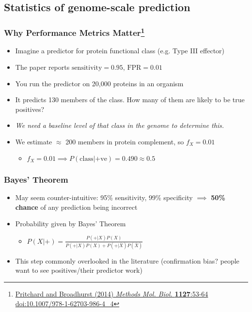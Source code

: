 


\subsection{Statistics of genome-scale prediction}
\begin{frame}
  \frametitle{Why Performance Metrics Matter\footnote{\tiny{\href{http://dx.doi.org/10.1007/978-1-62703-986-4_4}{Pritchard and Broadhurst (2014) \textit{Methods Mol. Biol.} \textbf{1127}:53-64 doi:10.1007/978-1-62703-986-4\_4}}}}
  \begin{itemize}
    \item<1-> Imagine a predictor for protein functional class (e.g. Type III effector)
    \item<1-> The paper reports \textbf{$\text{sensitivity}=0.95$}, \textbf{$\text{FPR}=0.01$}
    \item<1-> You run the predictor on 20,000 proteins in an organism
    \item<1-> It predicts 130 members of the class. How many of them are likely to be true positives?
    \item<2-> \textit{We need a baseline level of that class in the genome to determine this.}        
    \item<2-> We estimate $\approx$ 200 members in protein complement, so $f_X=0.01$
    \begin{itemize}
      \item $f_X = 0.01 \implies P(\text{class}|\text{+ve}) = 0.490 \approx 0.5$
    \end{itemize}
  \end{itemize} 
\end{frame}

\begin{frame}
  \frametitle{Bayes' Theorem}
  \begin{itemize}
    \item May seem counter-intuitive: 95\% sensitivity, 99\% specificity $\implies$ \textbf{50\% chance} of any prediction being incorrect
    \item Probability given by Bayes' Theorem
    \begin{itemize}
      \item $P(X|+) =  \frac{P(+|X) P(X)}{P(+|X) P(X) + P(+|\bar{X}) P(\bar{X})}$
    \end{itemize}
    \item This step commonly overlooked in the literature (confirmation bias? people want to see positives/their predictor work)
  \end{itemize} 
\end{frame}

